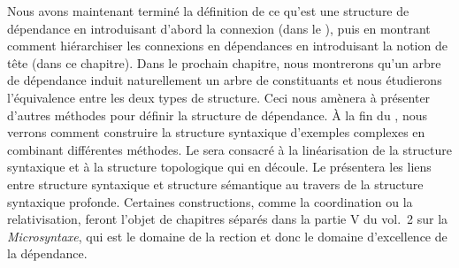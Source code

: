 Nous avons maintenant terminé la définition de ce qu’est une structure de dépendance en introduisant d’abord la connexion (dans le ), puis en montrant comment hiérarchiser les connexions en dépendances en introduisant la notion de tête (dans ce chapitre). Dans le prochain chapitre, nous montrerons qu’un arbre de dépendance induit naturellement un arbre de constituants et nous étudierons l’équivalence entre les deux types de structure. Ceci nous amènera à présenter d’autres méthodes pour définir la structure de dépendance. À la fin du , nous verrons comment construire la structure syntaxique d’exemples complexes en combinant différentes méthodes. Le  sera consacré à la linéarisation de la structure syntaxique et à la structure topologique qui en découle. Le  présentera les liens entre structure syntaxique et structure sémantique au travers de la structure syntaxique profonde. Certaines constructions, comme la coordination ou la relativisation, feront l’objet de chapitres séparés dans la partie V du vol.\ 2 sur la \textit{Microsyntaxe}, qui est le domaine de la rection et donc le domaine d’excellence de la dépendance.\largerpage

